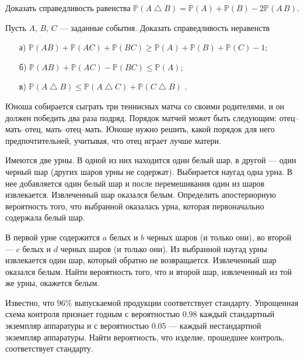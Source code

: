 \begin{problem}
Доказать справедливость равенства 
${\mathbb P}(A\bigtriangleup B)={\mathbb P}(A)+{\mathbb P}(B)-2{\mathbb P}(A\, B)$. 
\end{problem}


\begin{problem}
Пусть $A$, $B$, $C$ --- заданные события. Доказать справедливость неравенств 
\begin{enumerate}
\item[а)] ${\mathbb P}(AB)+{\mathbb P}(AC)+{\mathbb P}(BC)\geqslant {\mathbb P}(A)+{\mathbb P}(B)+{\mathbb P}(C)-1$; 
\item[б)] ${\mathbb P}(AB)+{\mathbb P}(AC)-{\mathbb P}(BC)\leqslant {\mathbb P}(A)$; 
\item[в)] ${\mathbb P}(A\bigtriangleup B)\leqslant {\mathbb P}(A\bigtriangleup C)+{\mathbb P}(C\bigtriangleup B)$ . 
\end{enumerate}
\end{problem}


\begin{problem}
Юноша собирается сыграть три теннисных матча со своими родителями, и он должен победить два раза подряд. 
Порядок матчей может быть следующим: отец--мать--отец, мать--отец--мать. Юноше нужно решить, какой порядок для него предпочтительней, 
учитывая, что отец играет лучше матери.

\end{problem}


\begin{problem}
Имеются две урны. В одной из них находится один белый шар, в другой --- один черный шар (других шаров урны не содержат). Выбирается 
наугад одна урна. В нее добавляется один белый шар и после перемешивания один из шаров извлекается. Извлеченный шар оказался белым. 
Определить апостериорную вероятность того, что выбранной оказалась урна, которая первоначально содержала белый шар. 
\end{problem}


\begin{problem}
В первой урне содержится $a$ белых и $b$ черных шаров (и только они), во второй --- $c$ белых и $d$ черных шаров 
(и только они). Из выбранной наугад урны извлекается один шар, который обратно не возвращается. Извлеченный шар оказался белым. 
Найти вероятность того, что и второй шар, извлеченный из той же урны, окажется белым. 
\end{problem}


\begin{problem}
Известно, что $96\%$ выпускаемой продукции соответствует стандарту. Упрощенная схема контроля признает годным с вероятностью 
$0.98$ каждый стандартный экземпляр аппаратуры и с вероятностью $0.05$ --- каждый нестандартной экземпляр аппаратуры. Найти вероятность, 
что изделие, прошедшее контроль, соответствует стандарту. 
\end{problem}


